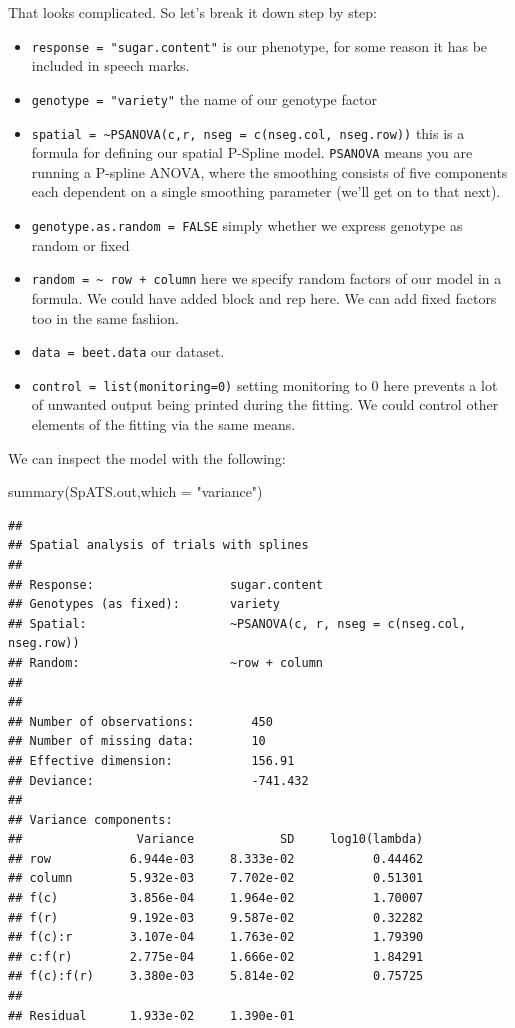 \documentclass[
]{book}
\newenvironment{Shaded}{\begin{snugshade}}{\end{snugshade}}
\newcommand{\AttributeTok}[1]{\textcolor[rgb]{0.77,0.63,0.00}{#1}}
\newcommand{\FunctionTok}[1]{\textcolor[rgb]{0.00,0.00,0.00}{#1}}
\newcommand{\NormalTok}[1]{#1}
\newcommand{\StringTok}[1]{\textcolor[rgb]{0.31,0.60,0.02}{#1}}
\providecommand{\tightlist}{%
  \setlength{\itemsep}{0pt}\setlength{\parskip}{0pt}}
\begin{document}
That looks complicated. So let's break it down step by step:

\begin{itemize}
\tightlist
\item
  \texttt{response\ =\ "sugar.content"} is our phenotype, for some reason it has be included in speech marks.
\item
  \texttt{genotype\ =\ "variety"} the name of our genotype factor\\
\item
  \texttt{spatial\ =\ \textasciitilde{}PSANOVA(c,r,\ nseg\ =\ c(nseg.col,\ nseg.row))} this is a formula for defining our spatial P-Spline model. \texttt{PSANOVA} means you are running a P-spline ANOVA, where the smoothing consists of five components each dependent on a single smoothing parameter (we'll get on to that next).
\item
  \texttt{genotype.as.random\ =\ FALSE} simply whether we express genotype as random or fixed
\item
  \texttt{random\ =\ \textasciitilde{}\ row\ +\ column} here we specify random factors of our model in a formula. We could have added block and rep here. We can add fixed factors too in the same fashion.
\item
  \texttt{data\ =\ beet.data} our dataset.
\item
  \texttt{control\ =\ list(monitoring=0)} setting monitoring to 0 here prevents a lot of unwanted output being printed during the fitting. We could control other elements of the fitting via the same means.
\end{itemize}

We can inspect the model with the following:

\begin{Shaded}
\begin{Highlighting}[]
\FunctionTok{summary}\NormalTok{(SpATS.out,}\AttributeTok{which =} \StringTok{"variance"}\NormalTok{)}
\end{Highlighting}
\end{Shaded}

\begin{verbatim}
## 
## Spatial analysis of trials with splines 
## 
## Response:                   sugar.content
## Genotypes (as fixed):       variety   
## Spatial:                    ~PSANOVA(c, r, nseg = c(nseg.col, nseg.row))
## Random:                     ~row + column
## 
## 
## Number of observations:        450
## Number of missing data:        10
## Effective dimension:           156.91
## Deviance:                      -741.432
## 
## Variance components:
##                Variance            SD     log10(lambda)
## row           6.944e-03     8.333e-02           0.44462
## column        5.932e-03     7.702e-02           0.51301
## f(c)          3.856e-04     1.964e-02           1.70007
## f(r)          9.192e-03     9.587e-02           0.32282
## f(c):r        3.107e-04     1.763e-02           1.79390
## c:f(r)        2.775e-04     1.666e-02           1.84291
## f(c):f(r)     3.380e-03     5.814e-02           0.75725
##                                                        
## Residual      1.933e-02     1.390e-01
\end{verbatim}
\end{document}
